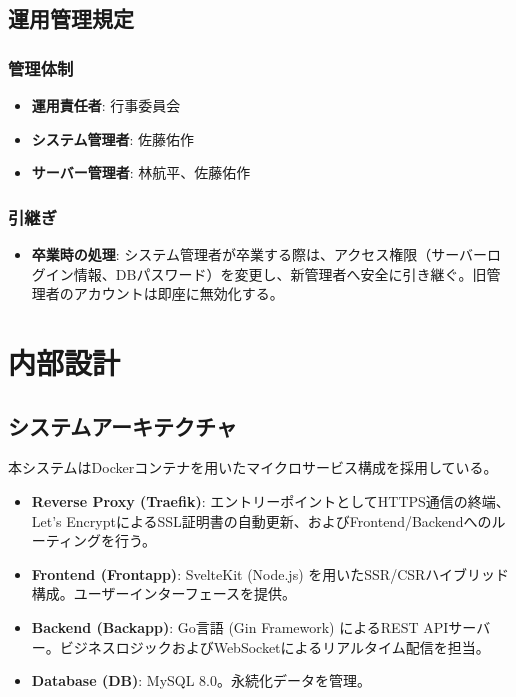\documentclass[paper=a4, fontsize=11pt]{jlreq}
\begin{document}
\subsection{運用管理規定}

\subsubsection{管理体制}
\begin{itemize}
    \item \textbf{運用責任者}: 行事委員会
    \item \textbf{システム管理者}: 佐藤佑作
    \item \textbf{サーバー管理者}: 林航平、佐藤佑作
\end{itemize}

\subsubsection{引継ぎ}
\begin{itemize}
    \item \textbf{卒業時の処理}: システム管理者が卒業する際は、アクセス権限（サーバーログイン情報、DBパスワード）を変更し、新管理者へ安全に引き継ぐ。旧管理者のアカウントは即座に無効化する。
\end{itemize}

\section{内部設計}

\subsection{システムアーキテクチャ}
本システムはDockerコンテナを用いたマイクロサービス構成を採用している。

\begin{itemize}
    \item \textbf{Reverse Proxy (Traefik)}: エントリーポイントとしてHTTPS通信の終端、Let's EncryptによるSSL証明書の自動更新、およびFrontend/Backendへのルーティングを行う。
    \item \textbf{Frontend (Frontapp)}: SvelteKit (Node.js) を用いたSSR/CSRハイブリッド構成。ユーザーインターフェースを提供。
    \item \textbf{Backend (Backapp)}: Go言語 (Gin Framework) によるREST APIサーバー。ビジネスロジックおよびWebSocketによるリアルタイム配信を担当。
    \item \textbf{Database (DB)}: MySQL 8.0。永続化データを管理。
\end{itemize}
\end{document}
